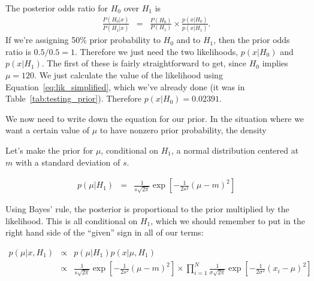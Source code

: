 The posterior odds ratio for $H_0$ over $H_1$ is
\begin{eqnarray}
\frac{P(H_0 | x)}{P(H_1|x)} &=& \frac{P(H_0)}{P(H_1)} \times
\frac{p(x|H_0)}{p(x|H_1)}\label{eq:odds_form2}.
\end{eqnarray}
If we're assigning 50\% prior probability to $H_0$ and to $H_1$, then the
prior odds ratio is $0.5 / 0.5 = 1$. Therefore we just need the two likelihoods,
$p(x | H_0)$ and $p(x | H_1)$. The first of these is fairly straightforward to
get, since $H_0$ implies $\mu = 120$. We just calculate the value of the
likelihood using Equation~\ref{eq:lik_simplified}, which we've already done
(it was in Table~\ref{tab:testing_prior}). Therefore
$p(x | H_0) = 0.02391$.


We now need to write down the equation for our prior. In the situation where
we want a certain value of $\mu$ to have nonzero prior probability, the density




Let's make the prior for $\mu$, conditional on $H_1$, a normal distribution
centered at $m$ with a standard deviation of $s$.

\begin{eqnarray}
p(\mu | H_1) &=& \frac{1}{s\sqrt{2\pi}}\exp
\left[-\frac{1}{2s^2}\left(\mu - m\right)^2\right]
\end{eqnarray}

Using Bayes' rule, the posterior is proportional to the prior multiplied by
the likelihood. This is all conditional on $H_1$, which we should remember
to put in the right hand side of the ``given'' sign in all of our terms:

\begin{eqnarray}
p(\mu | x, H_1) &\propto& p(\mu | H_1)p(x | \mu, H_1) \\
&\propto&
\frac{1}{s\sqrt{2\pi}}\exp
\left[-\frac{1}{2s^2}\left(\mu - m\right)^2\right]
\times
\prod_{i=1}^N \frac{1}{\sigma\sqrt{2\pi}}
\exp
\left[-\frac{1}{2\sigma^2}\left(x_i - \mu\right)^2\right]
\end{eqnarray}

